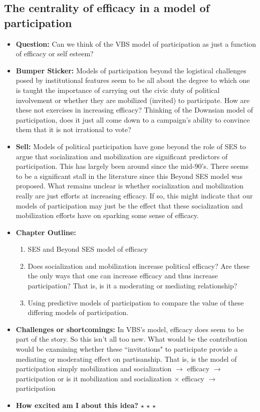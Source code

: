 \documentclass[12pt]{article}
\begin{document}
\subsection{The centrality of efficacy in a model of participation}
    \begin{itemize}
        \item \textbf{Question:} Can we think of the VBS model of participation as just a function of efficacy or self esteem?
        \item \textbf{Bumper Sticker:} Models of participation beyond the logistical challenges posed by institutional features seem to be all about the degree to which one is taught the importance of carrying out the civic duty of political involvement or whether they are mobilized (invited) to participate. How are these not exercises in increasing efficacy? Thinking of the Downsian model of participation, does it just all come down to a campaign's ability to convince them that it is not irrational to vote?
        \item \textbf{Sell:} Models of political participation have gone beyond the role of SES to argue that socialization and mobilization are significant predictors of participation. This has largely been around since the mid-90's. There seems to be a significant stall in the literature since this Beyond SES model was proposed. What remains unclear is whether socialization and mobilization really are just efforts at increasing efficacy. If so, this might indicate that our models of participation may just be the effect that these socialization and mobilization efforts have on sparking some sense of efficacy.
        \item \textbf{Chapter Outline:}
        \begin{enumerate}
            \item SES and Beyond SES model of efficacy
            \item Does socialization and mobilization increase political efficacy? Are these the only ways that one can increase efficacy and thus increase participation? That is, is it a moderating or mediating relationship?
            \item Using predictive models of participation to compare the value of these differing models of participation.
        \end{enumerate}
        \item \textbf{Challenges or shortcomings:} In VBS's model, efficacy does seem to be part of the story. So this isn't all too new. What would be the contribution would be examining whether these ``invitations" to participate provide a mediating or moderating effect on partisanship. That is, is the model of participation simply mobilization and socialization $\rightarrow$ efficacy $\rightarrow$ participation or is it mobilization and socialization $\times$ efficacy $\rightarrow$ participation
        \item \textbf{How excited am I about this idea?} $\star$ $\star$ $\star$
    \end{itemize}
\end{document}
